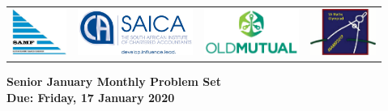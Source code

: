 \documentclass{article}
\begin{document}
\setlength{\tabcolsep}{5pt}
\begin{center} \begin{tabular}{cccc}
	\includegraphics[height=43pt]{SAMF_logo.jpg} &
	\includegraphics[height=43pt]{SAICA_logo.jpg} &
	\includegraphics[height=43pt]{OM_Logo_Stacked_Vignette_on_White_RGB.jpg} &
	\includegraphics[height=43pt]{SAMO2019.png}
\end{tabular} \end{center}

\bigskip

\begin{center}
\textbf{\Large Senior January Monthly Problem Set}
\\ \vspace{1em}
\textbf{\large Due: Friday, 17 January 2020}
\end{center}
\end{document}
